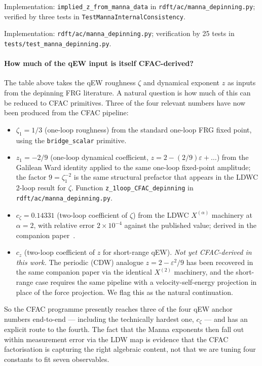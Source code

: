 \documentclass[10pt,a4paper,twocolumn]{article}
\theoremstyle{plain}
\theoremstyle{definition}
\newcommand{\eps}{\varepsilon}
\begin{document}
Implementation: \texttt{implied\_z\_from\_manna\_data} in
\texttt{rdft/ac/manna\_depinning.py}; verified by three tests in
\texttt{TestMannaInternalConsistency}.

Implementation: \texttt{rdft/ac/manna\_depinning.py}; verification
by 25 tests in \texttt{tests/test\_manna\_depinning.py}.

\paragraph{How much of the qEW input is itself CFAC-derived?}
The table above takes the qEW roughness $\zeta$ and dynamical
exponent $z$ as inputs from the depinning FRG literature.  A natural
question is how much of this can be reduced to CFAC primitives.
Three of the four relevant numbers have now been produced from the
CFAC pipeline:
\begin{itemize}[leftmargin=1.2em,itemsep=1pt]
  \item $\zeta_1 = 1/3$ (one-loop roughness) from the standard
    one-loop FRG fixed point, using the
    \texttt{bridge\_scalar} primitive.
  \item $z_1 = -2/9$ (one-loop dynamical coefficient,
    $z = 2 - (2/9)\eps + \ldots$) from the Galilean Ward identity
    applied to the same one-loop fixed-point amplitude; the
    factor $9 = \zeta_1^{-2}$ is the same structural prefactor
    that appears in the LDWC 2-loop result for $\zeta$.  Function
    \texttt{z\_1loop\_CFAC\_depinning} in
    \texttt{rdft/ac/manna\_depinning.py}.
  \item $c_\zeta = 0.14331$ (two-loop coefficient of $\zeta$)
    from the LDWC $X^{(\alpha)}$ machinery at $\alpha = 2$, with
    relative error $2\times 10^{-4}$ against the published value;
    derived in the companion paper~\citep{Amarteifio2026LDWC}.
  \item $c_z$ (two-loop coefficient of $z$ for short-range qEW).
    \emph{Not yet CFAC-derived in this work.}  The periodic (CDW)
    analogue $z = 2 - \eps^2/9$ has been recovered in the same
    companion paper via the identical $X^{(2)}$ machinery, and
    the short-range case requires the same pipeline with a
    velocity-self-energy projection in place of the force
    projection.  We flag this as the natural continuation.
\end{itemize}
So the CFAC programme presently reaches three of the four qEW
anchor numbers end-to-end --- including the technically hardest
one, $c_\zeta$ --- and has an explicit route to the fourth.  The
fact that the Manna exponents then fall out within measurement
error via the LDW map is evidence that the CFAC factorisation is
capturing the right algebraic content, not that we are tuning
four constants to fit seven observables.
\end{document}
